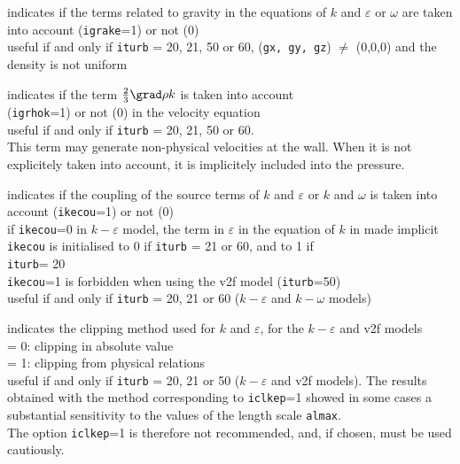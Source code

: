 {indicates if the terms related to gravity in the
equations of $k$ and $\varepsilon$ or $\omega$ are taken into account
({\tt igrake}=1) or not (0)\\
useful if and only if {\tt iturb} = 20, 21, 50 or 60, ({\tt gx, gy, gz})
$\ne$ (0,0,0) and the density is not uniform}

{indicates if the term $\frac{2}{3}\grad \rho k$
is taken into account\\ ({\tt igrhok}=1) or not (0) in the velocity
equation\\
useful if and only if {\tt iturb} = 20, 21, 50 or 60.\\
This term may generate
non-physical velocities at the wall. When it is not explicitely taken into
account, it is implicitely included into the pressure.}

{indicates if the coupling of the source terms of
$k$ and $\varepsilon$ or $k$ and $\omega$ is taken into account
({\tt ikecou}=1) or not (0)\\
if {\tt ikecou}=0 in $k-\varepsilon$ model, the term in $\varepsilon$ in the
equation of $k$ in made implicit\\
{\tt ikecou} is initialised to 0 if {\tt iturb} = 21 or 60,
and to 1 if\\
{\tt iturb}= 20\\
{\tt ikecou}=1 is forbidden when using the v2f model
({\tt iturb}=50)\\
useful if and only if {\tt iturb} = 20, 21 or 60 ($k-\varepsilon$ and
$k-\omega$ models)}

{indicates the clipping method used for $k$ and
$\varepsilon$, for the $k-\varepsilon$ and v2f models\\
\hspace*{1.3cm}= 0: clipping in absolute value\\
\hspace*{1.3cm}= 1: clipping from physical relations\\
useful if and only if {\tt iturb} = 20, 21 or 50 ($k-\varepsilon$ and
v2f models). The results obtained with the method corresponding to
{\tt iclkep}=1 showed in some cases a substantial sensitivity to the
values of the length scale {\tt almax}.\\
The option {\tt iclkep}=1 is therefore not recommended, and,
if chosen, must be used cautiously.}


